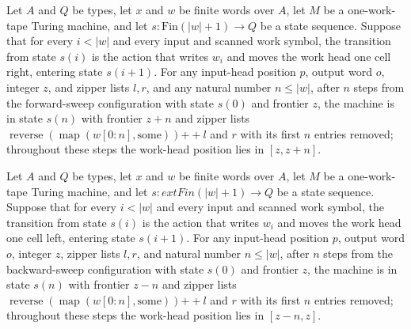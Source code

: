 \begin{lemma}
\label{Turing.FinTM.dgSpan_generate_right}
\leanok
{}
Let $A$ and $Q$ be types, let $x$ and $w$ be finite words over $A$, let $M$ be a
one-work-tape Turing machine, and let $s:\text{Fin}(|w|+1)\to Q$ be a state sequence.
Suppose that for every $i<|w|$ and every input and scanned work symbol, the transition
from state $s(i)$ is the action that writes $w_i$ and moves the work head one cell
right, entering state $s(i+1)$. For any input-head position $p$, output word $o$,
integer $z$, and zipper lists $l,r$, and any natural number $n\le |w|$, after $n$ steps
from the forward-sweep configuration with state $s(0)$ and frontier $z$, the machine is
in state $s(n)$ with frontier $z+n$ and zipper lists
$\operatorname{reverse}(\operatorname{map}(w[0:n],\mathrm{some}))\mathbin{+\!\!+}l$ and $r$
with its first $n$ entries removed; throughout these steps the work-head position lies
in $[z,z+n]$.
\end{lemma}

\begin{lemma}
\label{Turing.FinTM.dgSpan_generate_left}
\leanok
{}
Let $A$ and $Q$ be types, let $x$ and $w$ be finite words over $A$, let $M$ be a
one-work-tape Turing machine, and let $s:	ext{Fin}(|w|+1)\to Q$ be a state sequence.
Suppose that for every $i<|w|$ and every input and scanned work symbol, the transition
from state $s(i)$ is the action that writes $w_i$ and moves the work head one cell left,
entering state $s(i+1)$. For any input-head position $p$, output word $o$, integer $z$,
zipper lists $l,r$, and natural number $n\le |w|$, after $n$ steps from the
backward-sweep configuration with state $s(0)$ and frontier $z$, the machine is in state
$s(n)$ with frontier $z-n$ and zipper lists
$\operatorname{reverse}(\operatorname{map}(w[0:n],\mathrm{some}))\mathbin{+\!\!+}l$ and $r$
with its first $n$ entries removed; throughout these steps the work-head position lies
in $[z-n,z]$.
\end{lemma}


